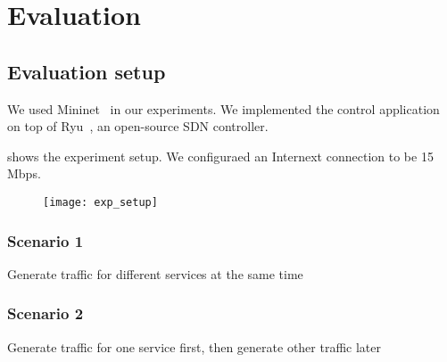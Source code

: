 \section{Evaluation}
\label{sect:experiment}
\subsection{Evaluation setup}
We used Mininet~\cite{mininet} in our experiments. We implemented the control application on top of Ryu~\cite{ryu}, an open-source SDN controller.

 shows the experiment setup. We configuraed an Internext connection to be 15 Mbps.

\begin{figure}[htb]
\centering
\texttt{[image: exp\_setup]}
\caption{}
\label{fig:setup}
\end{figure}

\subsubsection{Scenario 1}
Generate traffic for different services at the same time

\subsubsection{Scenario 2}
Generate traffic for one service first, then generate other traffic later  



